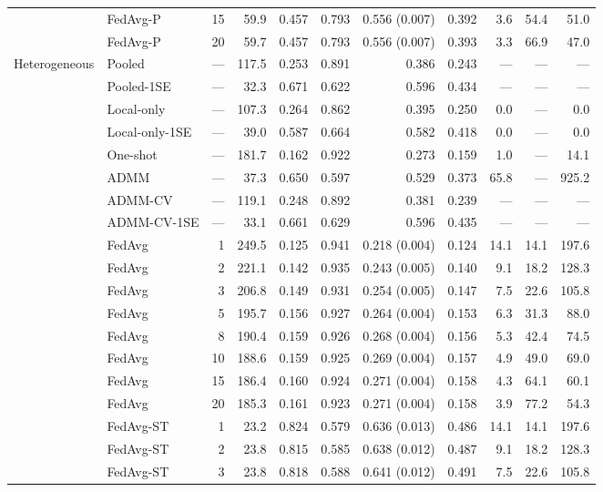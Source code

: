 \begin{longtable}{llrrrrrrrrr}
 & FedAvg-P & 15 & 59.9 & 0.457 & 0.793 & 0.556 (0.007) & 0.392 & 3.6 & 54.4 & 51.0 \\
 & FedAvg-P & 20 & 59.7 & 0.457 & 0.793 & 0.556 (0.007) & 0.393 & 3.3 & 66.9 & 47.0 \\
\midrule
Heterogeneous & Pooled & --- & 117.5 & 0.253 & 0.891 & 0.386 & 0.243 & --- & --- & --- \\
 & Pooled-1SE & --- & 32.3 & 0.671 & 0.622 & 0.596 & 0.434 & --- & --- & --- \\
 & Local-only & --- & 107.3 & 0.264 & 0.862 & 0.395 & 0.250 & 0.0 & --- & 0.0 \\
 & Local-only-1SE & --- & 39.0 & 0.587 & 0.664 & 0.582 & 0.418 & 0.0 & --- & 0.0 \\
 & One-shot & --- & 181.7 & 0.162 & 0.922 & 0.273 & 0.159 & 1.0 & --- & 14.1 \\
 & ADMM & --- & 37.3 & 0.650 & 0.597 & 0.529 & 0.373 & 65.8 & --- & 925.2 \\
 & ADMM-CV & --- & 119.1 & 0.248 & 0.892 & 0.381 & 0.239 & --- & --- & --- \\
 & ADMM-CV-1SE & --- & 33.1 & 0.661 & 0.629 & 0.596 & 0.435 & --- & --- & --- \\
 & FedAvg & 1 & 249.5 & 0.125 & 0.941 & 0.218 (0.004) & 0.124 & 14.1 & 14.1 & 197.6 \\
 & FedAvg & 2 & 221.1 & 0.142 & 0.935 & 0.243 (0.005) & 0.140 & 9.1 & 18.2 & 128.3 \\
 & FedAvg & 3 & 206.8 & 0.149 & 0.931 & 0.254 (0.005) & 0.147 & 7.5 & 22.6 & 105.8 \\
 & FedAvg & 5 & 195.7 & 0.156 & 0.927 & 0.264 (0.004) & 0.153 & 6.3 & 31.3 & 88.0 \\
 & FedAvg & 8 & 190.4 & 0.159 & 0.926 & 0.268 (0.004) & 0.156 & 5.3 & 42.4 & 74.5 \\
 & FedAvg & 10 & 188.6 & 0.159 & 0.925 & 0.269 (0.004) & 0.157 & 4.9 & 49.0 & 69.0 \\
 & FedAvg & 15 & 186.4 & 0.160 & 0.924 & 0.271 (0.004) & 0.158 & 4.3 & 64.1 & 60.1 \\
 & FedAvg & 20 & 185.3 & 0.161 & 0.923 & 0.271 (0.004) & 0.158 & 3.9 & 77.2 & 54.3 \\
 & FedAvg-ST & 1 & 23.2 & 0.824 & 0.579 & 0.636 (0.013) & 0.486 & 14.1 & 14.1 & 197.6 \\
 & FedAvg-ST & 2 & 23.8 & 0.815 & 0.585 & 0.638 (0.012) & 0.487 & 9.1 & 18.2 & 128.3 \\
 & FedAvg-ST & 3 & 23.8 & 0.818 & 0.588 & 0.641 (0.012) & 0.491 & 7.5 & 22.6 & 105.8 \\

\end{longtable}
